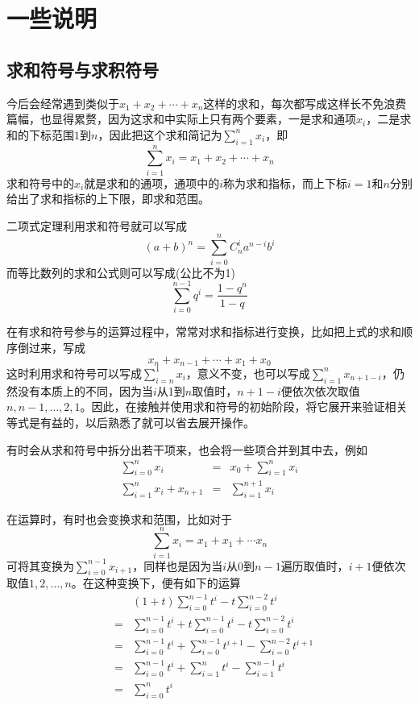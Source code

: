 
\section{一些说明}
\label{sec:some-instruction}

\subsection{求和符号与求积符号}
\label{sec:sum-prod-symbol}

今后会经常遇到类似于$x_1+x_2+\cdots+x_n$这样的求和，每次都写成这样长不免浪费篇幅，也显得累赘，因为这求和中实际上只有两个要素，一是求和通项$x_i$，二是求和的下标范围$1$到$n$，因此把这个求和简记为$\sum\limits_{i=1}^nx_i$，即
\[ \sum_{i=1}^n x_i = x_1+x_2+\cdots+x_n \]
求和符号中的$x_i$就是求和的通项，通项中的$i$称为求和指标，而上下标$i=1$和$n$分别给出了求和指标的上下限，即求和范围。

\begin{example}
  二项式定理利用求和符号就可以写成
  \[ (a+b)^n = \sum_{i=0}^n C_n^i a^{n-i}b^i \]
  而等比数列的求和公式则可以写成(公比不为1)
  \[ \sum_{i=0}^{n-1}q^i = \frac{1-q^n}{1-q} \]
\end{example}

在有求和符号参与的运算过程中，常常对求和指标进行变换，比如把上式的求和顺序倒过来，写成
\[ x_n+x_{n-1}+\cdots+x_1+x_0 \]
这时利用求和符号可以写成$\sum\limits_{i=n}^1x_i$，意义不变，也可以写成$\sum\limits_{i=1}^nx_{n+1-i}$，仍然没有本质上的不同，因为当$i$从1到$n$取值时，$n+1-i$便依次依次取值$n,n-1,\ldots,2,1$。因此，在接触并使用求和符号的初始阶段，将它展开来验证相关等式是有益的，以后熟悉了就可以省去展开操作。

有时会从求和符号中拆分出若干项来，也会将一些项合并到其中去，例如
\begin{eqnarray*}
  \sum_{i=0}^nx_i & = & x_0 + \sum_{i=1}^n x_i \\
  \sum_{i=1}^n x_i + x_{n+1} & = & \sum_{i=1}^{n+1} x_i
\end{eqnarray*}

在运算时，有时也会变换求和范围，比如对于
\[ \sum_{i=1}^{n} x_i = x_1 + x_1 + \cdots x_n \]
可将其变换为$\sum\limits_{i=0}^{n-1}x_{i+1}$，同样也是因为当$i$从$0$到$n-1$遍历取值时，$i+1$便依次取值$1,2,\ldots,n$。在这种变换下，便有如下的运算
\begin{eqnarray*}
  & & (1+t)\sum_{i=0}^{n-1}t^i - t \sum_{i=0}^{n-2}t^i \\
  & = & \sum_{i=0}^{n-1}t^i + t\sum_{i=0}^{n-1}t^i - t\sum_{i=0}^{n-2}t^i \\
  & = & \sum_{i=0}^{n-1}t^i + \sum_{i=0}^{n-1}t^{i+1} -\sum_{i=0}^{n-2}t^{i+1} \\
  & = & \sum_{i=0}^{n-1}t^i + \sum_{i=1}^{n}t^i - \sum_{i=1}^{n-1}t^i \\
  & = & \sum_{i=0}^{n}t^i
\end{eqnarray*}

